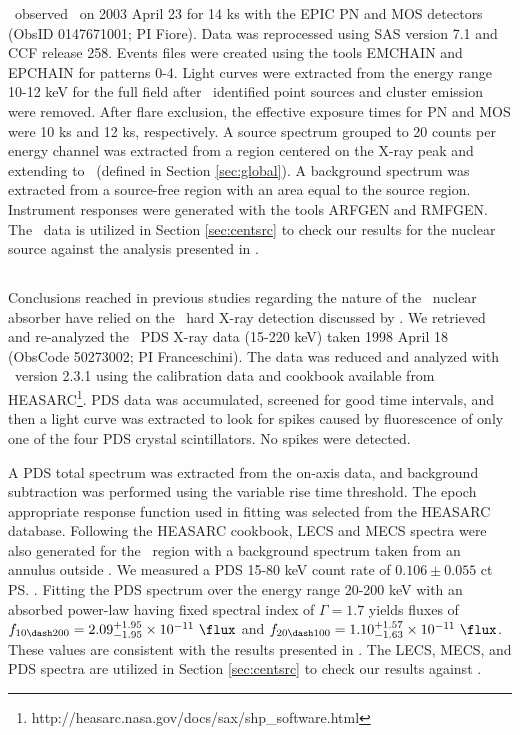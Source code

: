 \documentclass[useAMS,usenatbib]{mn2e}
\begin{document}
\xmm\ observed \irs\ on 2003 April 23 for 14 ks with the EPIC PN and
MOS detectors (ObsID 0147671001; PI Fiore). Data was reprocessed using
SAS version 7.1 and CCF release 258. Events files were created using
the tools {\textsc{EMCHAIN}} and {\textsc{EPCHAIN}} for patterns
0-4. Light curves were extracted from the energy range 10-12 keV for
the full field after \chandra\ identified point sources and cluster
emission were removed. After flare exclusion, the effective exposure
times for PN and MOS were 10 ks and 12 ks, respectively. A source
spectrum grouped to 20 counts per energy channel was extracted from a
region centered on the X-ray peak and extending to \rf\ (defined in
Section \ref{sec:global}). A background spectrum was extracted from a
source-free region with an area equal to the source region. Instrument
responses were generated with the tools {\textsc{ARFGEN}} and
{\textsc{RMFGEN}}. The \xmm\ data is utilized in Section
\ref{sec:centsrc} to check our results for the nuclear source against
the analysis presented in \citet{2007A&A...473...85P}.

\subsection{\bepposax}
\label{sec:beppo}

Conclusions reached in previous studies regarding the nature of the
\irs\ nuclear absorber have relied on the \bepposax\ hard X-ray
detection discussed by \citet{2000A&A...353..910F}. We retrieved and
re-analyzed the \bepposax\ PDS X-ray data (15-220 keV) taken 1998
April 18 (ObsCode 50273002; PI Franceschini). The data was reduced and
analyzed with \saxdas\ version 2.3.1 using the calibration data and
cookbook available from
HEASARC\footnote{http://heasarc.nasa.gov/docs/sax/shp\_software.html}. PDS
data was accumulated, screened for good time intervals, and then a
light curve was extracted to look for spikes caused by fluorescence of
only one of the four PDS crystal scintillators. No spikes were
detected.

A PDS total spectrum was extracted from the on-axis data, and
background subtraction was performed using the variable rise time
threshold. The epoch appropriate response function used in fitting was
selected from the HEASARC database. Following the HEASARC cookbook,
LECS and MECS spectra were also generated for the \rf\ region with a
background spectrum taken from an annulus outside \rf. We measured a
PDS 15-80 keV count rate of $0.106 \pm 0.055$ ct \ps. Fitting the PDS
spectrum over the energy range 20-200 keV with an absorbed power-law
having fixed spectral index of $\Gamma = 1.7$ yields fluxes of $f_{10
  \dash 200} = 2.09^{+1.95}_{-1.95} \times 10^{-11} ~\flux$ and $f_{20
  \dash 100} = 1.10^{+1.57}_{-1.63} \times 10^{-11} ~\flux$. These
values are consistent with the results presented in
\citet{2000A&A...353..910F}. The LECS, MECS, and PDS spectra are
utilized in Section \ref{sec:centsrc} to check our results against
\citet{2000A&A...353..910F}.
\end{document}
